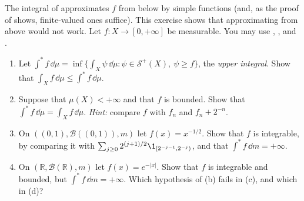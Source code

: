 \begin{exercise}\label{ex:in-from-below}
\medium The integral of  approximates $f$ from below by simple
functions (and, as the proof of  shows, finite-valued ones
suffice). This exercise shows that approximating from above would not work. Let
$f:X\to[0,+\infty]$ be measurable. You may use ,
,  and .
\begin{enumerate}[label=(\alph*)]
  \item Let $\int^*f\,\dd\mu=\inf\{\int_X\psi\,\dd\mu:\psi\in\mathcal S^+(X),\ \psi\ge f\}$, the
    \emph{upper integral}. Show that $\int_Xf\,\dd\mu\le\int^*f\,\dd\mu$.
  \item Suppose that $\mu(X)<+\infty$ and that $f$ is bounded. Show that
    $\int^*f\,\dd\mu=\int_Xf\,\dd\mu$. \emph{Hint:} compare $f$ with $f_n$ and $f_n+2^{-n}$.
  \item On $((0,1),\mathcal B((0,1)),m)$ let $f(x)=x^{-1/2}$. Show that $f$ is integrable, by
    comparing it with $\sum_{j\ge0}2^{(j+1)/2}\1_{[2^{-j-1},2^{-j})}$, and that
    $\int^*f\,\dd m=+\infty$.
  \item On $(\mathbb R,\mathcal B(\mathbb R),m)$ let $f(x)=e^{-|x|}$. Show that $f$ is
    integrable and bounded, but $\int^*f\,\dd m=+\infty$. Which hypothesis of (b) fails in (c),
    and which in (d)?
\end{enumerate}
\end{exercise}

